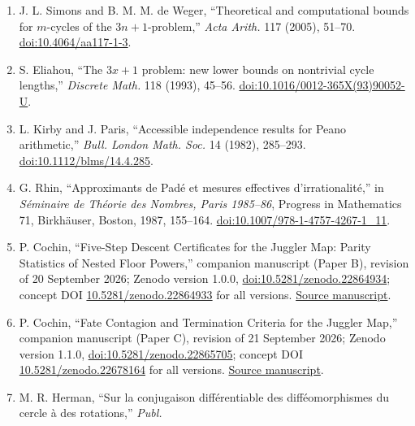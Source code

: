 \documentclass[12pt]{article}
\begin{document}
\begin{enumerate}
  K. R. Matthews and A. M. Watts, ``A generalization of Hasse's
  generalization of the Syracuse algorithm,'' \emph{Acta Arith.} 43
  (1984), 167--175.
  \href{https://doi.org/10.4064/aa-43-2-167-175}{doi:10.4064/aa-43-2-167-175}.
\item
  J. L. Simons and B. M. M. de Weger, ``Theoretical and computational
  bounds for \(m\)-cycles of the \(3n+1\)-problem,'' \emph{Acta Arith.}
  117 (2005), 51--70.
  \href{https://doi.org/10.4064/aa117-1-3}{doi:10.4064/aa117-1-3}.
\item
  S. Eliahou, ``The \(3x+1\) problem: new lower bounds on nontrivial
  cycle lengths,'' \emph{Discrete Math.} 118 (1993), 45--56.
  \href{https://doi.org/10.1016/0012-365X(93)90052-U}{doi:10.1016/0012-365X(93)90052-U}.
\item
  L. Kirby and J. Paris, ``Accessible independence results for Peano
  arithmetic,'' \emph{Bull. London Math. Soc.} 14 (1982), 285--293.
  \href{https://doi.org/10.1112/blms/14.4.285}{doi:10.1112/blms/14.4.285}.
\item
  G. Rhin, ``Approximants de Pad\'{e} et mesures effectives
  d'irrationalit\'{e},'' in \emph{S\'{e}minaire de Th\'{e}orie des
  Nombres, Paris 1985--86}, Progress in Mathematics 71, Birkh\"{a}user,
  Boston, 1987, 155--164.
  \href{https://doi.org/10.1007/978-1-4757-4267-1_11}{doi:10.1007/978-1-4757-4267-1\_11}.
\item
  P. Cochin, ``Five-Step Descent Certificates for the Juggler Map:
  Parity Statistics of Nested Floor Powers,'' companion manuscript
  (Paper B), revision of 20 September 2026; Zenodo version 1.0.0,
  \href{https://doi.org/10.5281/zenodo.22864934}{doi:10.5281/zenodo.22864934};
  concept DOI
  \href{https://doi.org/10.5281/zenodo.22864933}{10.5281/zenodo.22864933}
  for all versions.
  \href{https://github.com/sneakyweasel/btlab/blob/main/docs/theory/juggler_parity_discrepancy_note.md}{Source
  manuscript}.
\item
  P. Cochin, ``Fate Contagion and Termination Criteria for the Juggler
  Map,'' companion manuscript (Paper C), revision of 21 September 2026;
  Zenodo version 1.1.0,
  \href{https://doi.org/10.5281/zenodo.22865705}{doi:10.5281/zenodo.22865705};
  concept DOI
  \href{https://doi.org/10.5281/zenodo.22678164}{10.5281/zenodo.22678164}
  for all versions.
  \href{https://github.com/sneakyweasel/btlab/blob/main/docs/theory/juggler_fate_almost_all_note.md}{Source
  manuscript}.
\item
  M. R. Herman, ``Sur la conjugaison diff\'{e}rentiable des
  diff\'{e}omorphismes du cercle \`{a} des rotations,'' \emph{Publ.
}
\end{enumerate}
\end{document}
